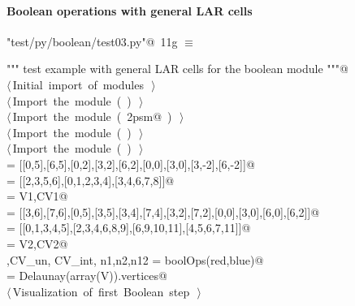 \documentclass[11pt,oneside]{article}	%
\begin{document}
\paragraph{Boolean operations with general LAR cells}

\begin{flushleft} \small
\begin{minipage}{\linewidth} \label{scrap30}
\protect{}\verb@"test/py/boolean/test03.py"@\nobreak\ {\footnotesize 11g }$\equiv$
\vspace{-1ex}
\begin{list}{}{} \item
\mbox{}\verb@""" test example with general LAR cells for the boolean module """@\\
\mbox{}\verb@@\hbox{$\langle\,$Initial import of modules\nobreak\ {\footnotesize {}}$\,\rangle$}\verb@@\\
\mbox{}\verb@@\hbox{$\langle\,$Import the module\nobreak\ ({\footnotesize {}\label{scrap31}
 }\mbox{}\verb@boolean@ ) {\footnotesize {}}$\,\rangle$}\verb@@\\
\mbox{}\verb@@\hbox{$\langle\,$Import the module\nobreak\ ({\footnotesize {}\label{scrap32}
 }\mbox{}\verb@lar2psm@ ) {\footnotesize {}}$\,\rangle$}\verb@@\\
\mbox{}\verb@@\hbox{$\langle\,$Import the module\nobreak\ ({\footnotesize {}\label{scrap33}
 }\mbox{}\verb@simplexn@ ) {\footnotesize {}}$\,\rangle$}\verb@@\\
\mbox{}\verb@@\hbox{$\langle\,$Import the module\nobreak\ ({\footnotesize {}\label{scrap34}
 }\mbox{}\verb@larcc@ ) {\footnotesize {}}$\,\rangle$}\verb@@\\
\mbox{} = [[0,5],[6,5],[0,2],[3,2],[6,2],[0,0],[3,0],[3,-2],[6,-2]]@\\
\mbox{} = [[2,3,5,6],[0,1,2,3,4],[3,4,6,7,8]]@\\
\mbox{}\verb@blue = V1,CV1@\\
\mbox{} = [[3,6],[7,6],[0,5],[3,5],[3,4],[7,4],[3,2],[7,2],[0,0],[3,0],[6,0],[6,2]]@\\
\mbox{} = [[0,1,3,4,5],[2,3,4,6,8,9],[6,9,10,11],[4,5,6,7,11]]@\\
\mbox{}\verb@red = V2,CV2@\\
\mbox{}\verb@V,CV_un, CV_int, n1,n2,n12 = boolOps(red,blue)@\\
\mbox{}\verb@CV = Delaunay(array(V)).vertices@\\
\mbox{}\verb@@\hbox{$\langle\,$Visualization of first Boolean step\nobreak\ {\footnotesize {}}$\,\rangle$}\verb@@\\
\mbox{}\verb@@{\NWsep}
\end{list}
\vspace{-2ex}
\end{minipage}\\[4ex]
\end{flushleft}
\end{document}
